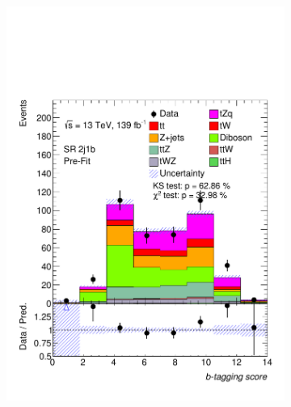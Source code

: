 \begin{figure}
\begin{subfigure}[b]{0.32\linewidth}
    \includegraphics[width=\linewidth]{ubonn-thesis/Chapters/Chapters_06/Figure/Input_distribution/SR_2j1b_btag.pdf} 
  \end{subfigure} 
  \newline
  \centering
  \begin{subfigure}[b]{0.32\linewidth}

\end{subfigure}
\end{figure}
